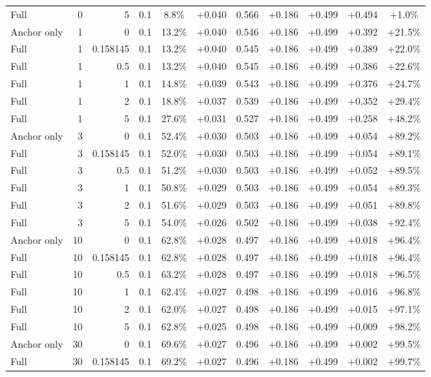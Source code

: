 \begin{table}[htbp]
\begin{tabular}{lrrrccccccc}
Full & 0 & 5 & 0.1 & 8.8\% & +0.040 & 0.566 & +0.186 & +0.499 & +0.494 & +1.0\% \\
Anchor only & 1 & 0 & 0.1 & 13.2\% & +0.040 & 0.546 & +0.186 & +0.499 & +0.392 & +21.5\% \\
Full & 1 & 0.158145 & 0.1 & 13.2\% & +0.040 & 0.545 & +0.186 & +0.499 & +0.389 & +22.0\% \\
Full & 1 & 0.5 & 0.1 & 13.2\% & +0.040 & 0.545 & +0.186 & +0.499 & +0.386 & +22.6\% \\
Full & 1 & 1 & 0.1 & 14.8\% & +0.039 & 0.543 & +0.186 & +0.499 & +0.376 & +24.7\% \\
Full & 1 & 2 & 0.1 & 18.8\% & +0.037 & 0.539 & +0.186 & +0.499 & +0.352 & +29.4\% \\
Full & 1 & 5 & 0.1 & 27.6\% & +0.031 & 0.527 & +0.186 & +0.499 & +0.258 & +48.2\% \\
Anchor only & 3 & 0 & 0.1 & 52.4\% & +0.030 & 0.503 & +0.186 & +0.499 & +0.054 & +89.2\% \\
Full & 3 & 0.158145 & 0.1 & 52.0\% & +0.030 & 0.503 & +0.186 & +0.499 & +0.054 & +89.1\% \\
Full & 3 & 0.5 & 0.1 & 51.2\% & +0.030 & 0.503 & +0.186 & +0.499 & +0.052 & +89.5\% \\
Full & 3 & 1 & 0.1 & 50.8\% & +0.029 & 0.503 & +0.186 & +0.499 & +0.054 & +89.3\% \\
Full & 3 & 2 & 0.1 & 51.6\% & +0.029 & 0.503 & +0.186 & +0.499 & +0.051 & +89.8\% \\
Full & 3 & 5 & 0.1 & 54.0\% & +0.026 & 0.502 & +0.186 & +0.499 & +0.038 & +92.4\% \\
Anchor only & 10 & 0 & 0.1 & 62.8\% & +0.028 & 0.497 & +0.186 & +0.499 & +0.018 & +96.4\% \\
Full & 10 & 0.158145 & 0.1 & 62.8\% & +0.028 & 0.497 & +0.186 & +0.499 & +0.018 & +96.4\% \\
Full & 10 & 0.5 & 0.1 & 63.2\% & +0.028 & 0.497 & +0.186 & +0.499 & +0.018 & +96.5\% \\
Full & 10 & 1 & 0.1 & 62.4\% & +0.027 & 0.498 & +0.186 & +0.499 & +0.016 & +96.8\% \\
Full & 10 & 2 & 0.1 & 62.0\% & +0.027 & 0.498 & +0.186 & +0.499 & +0.015 & +97.1\% \\
Full & 10 & 5 & 0.1 & 62.8\% & +0.025 & 0.498 & +0.186 & +0.499 & +0.009 & +98.2\% \\
Anchor only & 30 & 0 & 0.1 & 69.6\% & +0.027 & 0.496 & +0.186 & +0.499 & +0.002 & +99.5\% \\
Full & 30 & 0.158145 & 0.1 & 69.2\% & +0.027 & 0.496 & +0.186 & +0.499 & +0.002 & +99.7\% \\

\end{tabular}
\end{table}

